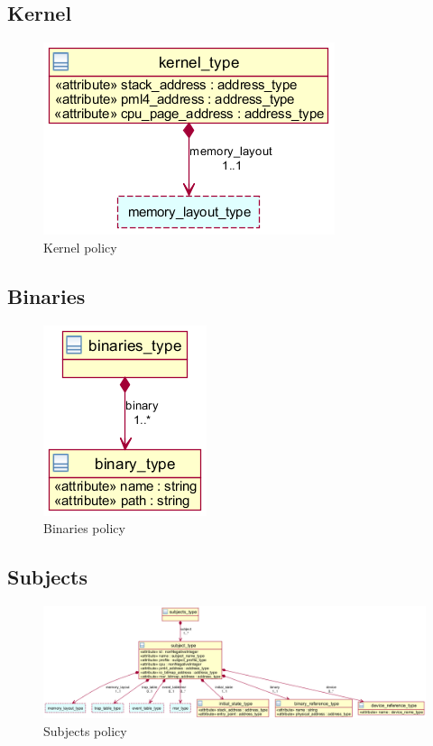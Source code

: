 \subsection{Kernel}
\begin{figure}[h]
	\centering
	\includegraphics[scale=0.6]{images/xml_kernel.png}
	\caption{Kernel policy}
\end{figure}


\subsection{Binaries}
\begin{figure}[h]
	\centering
	\includegraphics[scale=0.6]{images/xml_binary.png}
	\caption{Binaries policy}
\end{figure}


\subsection{Subjects}
\begin{figure}
	\includegraphics[width=\textwidth]{images/xml_subject.png}
	\caption{Subjects policy}
\end{figure}


